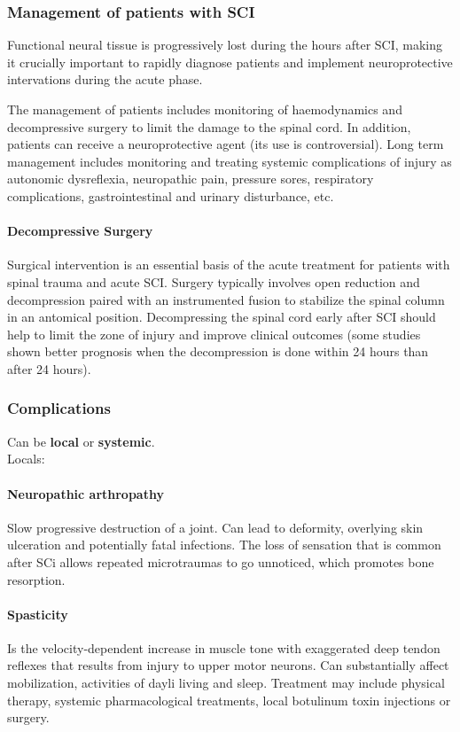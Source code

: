 \documentclass[12pt,article,oneside,a4paper]{memoir}
\begin{document}
\subsubsection{Management of patients with SCI}
Functional neural tissue is progressively lost during the hours after SCI,
making it crucially important to rapidly diagnose patients and implement
neuroprotective intervations during the acute phase.

The management of patients includes monitoring of haemodynamics and decompressive
surgery to limit the damage to the spinal cord. In addition, patients can receive
a neuroprotective agent (its use is controversial). Long term management includes
monitoring and treating systemic complications of injury as autonomic dysreflexia,
neuropathic pain, pressure sores, respiratory complications, gastrointestinal and
urinary disturbance, etc.

\paragraph{Decompressive Surgery}
Surgical intervention is an essential basis of the acute treatment for patients
with spinal trauma and acute SCI. Surgery typically involves open reduction and
decompression paired with an instrumented fusion to stabilize the spinal column
in an antomical position. Decompressing the spinal cord early after SCI should
help to limit the zone of injury and improve clinical outcomes (some studies
shown better prognosis when the decompression is done within 24 hours than after
24 hours).

\subsubsection{Complications}
Can be \textbf{local} or \textbf{systemic}. \\

Locals:
\paragraph{Neuropathic arthropathy}
Slow progressive destruction of a joint. Can lead to deformity, overlying skin
ulceration and potentially fatal infections. The loss of sensation that is
common after SCi allows repeated microtraumas to go unnoticed, which promotes
bone resorption.

\paragraph{Spasticity}
Is the velocity-dependent increase in muscle tone with exaggerated deep tendon
reflexes that results from injury to upper motor neurons. Can substantially
affect mobilization, activities of dayli living and sleep. Treatment may include
physical therapy, systemic pharmacological treatments, local botulinum toxin
injections or surgery.
\end{document}
